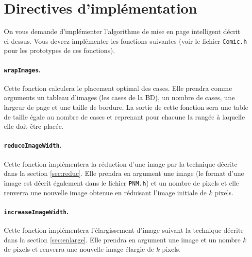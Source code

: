 \documentclass[a4paper,10pt]{article}
\begin{document}
\section{Directives d'implémentation}

On vous demande d'implémenter l'algorithme de mise en page intelligent
décrit ci-dessus. Vous devrez implémenter les fonctions suivantes
(voir le fichier \texttt{Comic.h} pour les prototypes de ces
fonctions).

\paragraph{\texttt{wrapImages}.} Cette fonction calculera le placement optimal
des cases. Elle prendra comme arguments un tableau d'images (les cases de la
BD), un nombre de cases, une largeur de page et une taille de bordure. La
sortie de cette fonction sera une table de taille égale au nombre de cases et
reprenant pour chacune la rangée à laquelle elle doit être placée.

\paragraph{\texttt{reduceImageWidth}.} Cette fonction implémentera la réduction
d'une image par la technique décrite dans la section \ref{sec:reduc}. Elle
prendra en argument une image (le format d'une image est décrit également dans
le fichier \texttt{PNM.h}) et un nombre de pixels et elle renverra une nouvelle
image obtenue en réduisant l'image initiale de $k$ pixels.


\paragraph{\texttt{increaseImageWidth}.} Cette fonction implémentera
l'élargissement d'image suivant la technique décrite dans la section
\ref{sec:enlarge}. Elle prendra en argument une image et un nombre $k$ de
pixels et renverra une nouvelle image élargie de $k$ pixels.
\end{document}
